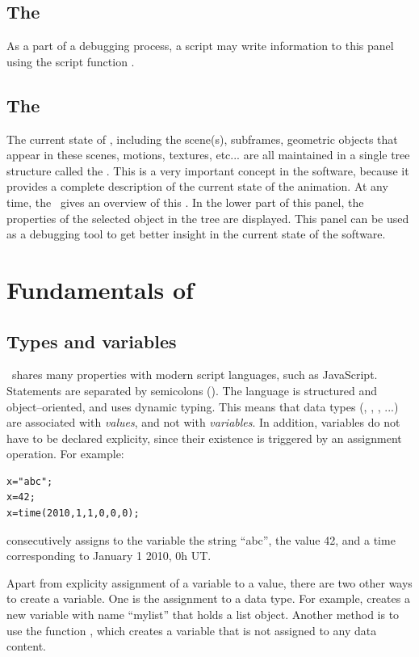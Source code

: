 \subsection{The \outputpanel}
As a part of a debugging process, a script may write information to this panel using the script function .

\subsection{The \objectspanel}
The current state of \softwarename, including the scene(s), subframes, geometric objects that appear in these scenes, motions, textures, etc... are all maintained in a single tree structure called the \objecttree. This is a very important concept in the software, because it provides a complete description of the current state of the animation. At any time, the \objectspanel\ gives an overview of this \objecttree. In the lower part of this panel, the properties of the selected object in the tree are displayed. This panel can be used as a debugging tool to get better insight in the current state of the software.

\section{Fundamentals of \scriptlang}

\subsection{Types and variables}
\scriptlang\ shares many properties with modern script languages, such as JavaScript. Statements are separated by semicolons (\sourcecode{;}). The language is structured and object--oriented, and uses dynamic typing. This means that data types (, , , ...) are associated with \emph{values}, and not with \emph{variables}. In addition, variables do not have to be declared explicity, since their existence is triggered by an assignment operation. For example:

\begin{lstlisting}
x="abc";
x=42;
x=time(2010,1,1,0,0,0);
\end{lstlisting}

consecutively assigns to the variable  the string "`abc"', the value 42, and a time corresponding to January 1 2010, 0h UT.

Apart from explicity assignment of a variable to a value, there are two other ways to create a variable. One is the assignment to a data type. For example,  creates a new variable with name ``mylist'' that holds a list object. Another method is to use the function , which creates a variable that is not assigned to any data content.

